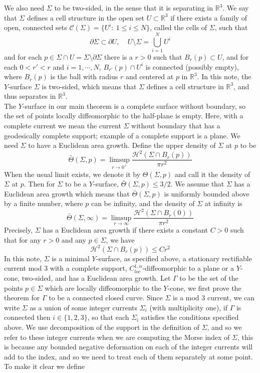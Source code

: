\documentclass[10pt,a4paper]{amsart}
\theoremstyle{theorem}
\theoremstyle{definition}
\numberwithin{equation}{section}
\begin{document}
We also need $\Sigma$ to be two-sided, in the sense that it is separating in $\mathbb{R}^3$. We say that $\Sigma$ defines a cell structure in the open set $U\subset \mathbb{R}^3$ if there exists a family of open, connected sets $\mathcal{C}(\Sigma)=\{ U^i:\ 1\leq i\leq N\}$, called the cells of $\Sigma$, such that
$$
\partial \Sigma \subset \partial U,\ \ \ \ \ U\setminus \Sigma =\bigcup_{i=1}^N
U^i$$
and for each $p\in \Sigma \cap U=\Sigma \setminus \partial \Sigma$ there is a $r>0$ such that $B_r(p)\subset U$, and for each $0<r'<r$ and $i=1,\cdots,N$, $B_{r'}(p)\cap U^i$ is connected (possibly empty), where $B_r(p)$ is the ball with radius $r$ and centered at $p$ in $\mathbb{R}^3$. In this note, the $Y$-surface $\Sigma$ is two-sided, which means that $\Sigma$ defines a cell structure in $\mathbb{R}^3$, and thus separates in $\mathbb{R}^3$.\\ 
The $Y$-surface in our main theorem is a complete surface without boundary, so the set of points locally diffeomorphic to the half-plane is empty. Here, with a complete current we mean the current $\Sigma$ without boundary that has a geodesically complete support; example of a complete support is a plane. We need $\Sigma$ to have a Euclidean area growth. Define the upper density of $\Sigma$ at $p$ to be 
$$
\bar{\Theta}(\Sigma ,p)=\limsup_{r\to 0^+} \frac{\mathcal{H}^2(\Sigma \cap B_r(p))}{\pi r^2}
$$
When the usual limit exists, we denote it by $\Theta(\Sigma ,p)$ and call it the density of $\Sigma$ at $p$. Then for $\Sigma$ to be a $Y$-surface, $\bar{\Theta}(\Sigma,p)\leq 3/2$. We assume that $\Sigma$ has a Euclidean area growth which means that $\bar{\Theta}(\Sigma ,p)$ is uniformly bounded above by a finite number, where $p$ can be infinity, and the density of $\Sigma$ at infinity is
$$
\bar{\Theta}(\Sigma ,\infty)=\limsup_{r\to \infty} \frac{\mathcal{H}^2(\Sigma \cap B_r(0))}{\pi r^2}
$$
Precisely, $\Sigma$ has a Euclidean area growth if there exists a constant $C>0$ such that for any $r>0$ and any $p\in \Sigma$, we have
$$
\mathcal{H}^2(\Sigma \cap B_r(p)) \leq Cr^2
$$
In this note, $\Sigma$ is a minimal $Y$-surface, as specified above, a stationary rectifiable current mod $3$ with a complete support, $C_{loc}^{1,\alpha}$-diffeomorphic to a plane or a $Y$-cone, two-sided, and has a Euclidean area growth. Let $\Gamma$ to be the set of the points $p\in \Sigma$ which are locally diffeomorphic to the $Y$-cone, we first prove the theorem for $\Gamma$ to be a connected closed curve. Since $\Sigma$ is a mod 3 current, we can write $\Sigma$ as a union of some integer currents $\Sigma_i$ (with multiplicity one), if $\Gamma$ is connected then $i\in \{1,2,3\}$, so that each $\Sigma_i$ satisfies the conditions specified above. We use decomposition of the support in the definition of $\Sigma$, and so we refer to these integer currents when we are computing the Morse index of $\Sigma$, this is because any bounded negative deformation on each of the integer currents will add to the index, and so we need to treat each of them separately at some point. To make it clear we define
\end{document}
